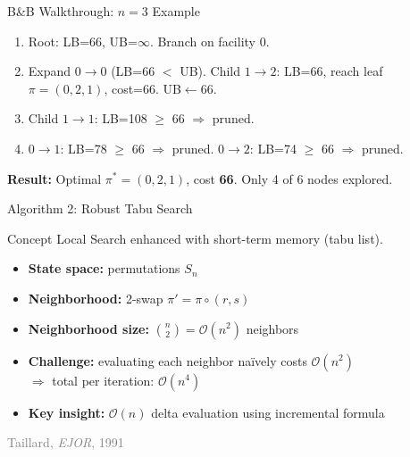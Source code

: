 \documentclass[aspectratio=169,11pt]{beamer}
\newcommand{\Sn}{S_n}
\newcommand{\BigO}{\mathcal{O}}
\newcommand{\reference}[1]{\hfill{\scriptsize\textcolor{gray}{#1}}}
\begin{document}
\begin{frame}[shrink=5]{B\&B Walkthrough: $n=3$ Example}
\vspace{4pt}
\begin{enumerate}\itemsep0pt
\item Root: LB=66, UB=$\infty$. Branch on facility 0.
\item Expand $0\!\to\!0$ (LB=66 $<$ UB). Child $1\!\to\!2$: LB=66, reach leaf $\pi\!=\!(0,2,1)$, cost=\alert{66}. UB$\leftarrow$66.
\item Child $1\!\to\!1$: LB=108 $\ge$ 66 $\Rightarrow$ \alert{pruned}.
\item $0\!\to\!1$: LB=78 $\ge$ 66 $\Rightarrow$ \alert{pruned}. \quad $0\!\to\!2$: LB=74 $\ge$ 66 $\Rightarrow$ \alert{pruned}.
\end{enumerate}
\textbf{Result:} Optimal $\pi^*\!=\!(0,2,1)$, cost \textbf{66}. Only 4 of 6 nodes explored.
\end{frame}

\begin{frame}{Algorithm 2: Robust Tabu Search}
\begin{block}{Concept}
\alert{Local Search} enhanced with \alert{short-term memory} (tabu list).
\end{block}
\vspace{4pt}
\begin{itemize}\setlength\itemsep{6pt}
  \item \textbf{State space:} permutations $\Sn$
  \item \textbf{Neighborhood:} 2-swap \quad $\pi' = \pi\circ(r,s)$
  \item \textbf{Neighborhood size:} $\binom{n}{2} = \BigO(n^2)$ neighbors
  \item \textbf{Challenge:} evaluating each neighbor na\"ively costs $\BigO(n^2)$ \\
        $\Rightarrow$ total per iteration: $\BigO(n^4)$
  \item \textbf{Key insight:} \alert{$\BigO(n)$ delta evaluation} using incremental formula
\end{itemize}
\vspace{4pt}
\reference{Taillard, \emph{EJOR}, 1991}
\end{frame}
\end{document}

